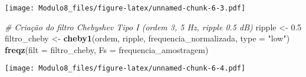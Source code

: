 \documentclass[
]{article}
\newenvironment{Shaded}{\begin{snugshade}}{\end{snugshade}}
\newcommand{\AttributeTok}[1]{\textcolor[rgb]{0.13,0.29,0.53}{#1}}
\newcommand{\CommentTok}[1]{\textcolor[rgb]{0.56,0.35,0.01}{\textit{#1}}}
\newcommand{\FloatTok}[1]{\textcolor[rgb]{0.00,0.00,0.81}{#1}}
\newcommand{\FunctionTok}[1]{\textcolor[rgb]{0.13,0.29,0.53}{\textbf{#1}}}
\newcommand{\NormalTok}[1]{#1}
\newcommand{\OtherTok}[1]{\textcolor[rgb]{0.56,0.35,0.01}{#1}}
\newcommand{\StringTok}[1]{\textcolor[rgb]{0.31,0.60,0.02}{#1}}
\begin{document}
\texttt{[image: Modulo8\_files/figure-latex/unnamed-chunk-6-3.pdf]}

\begin{Shaded}
\begin{Highlighting}[]
\CommentTok{\# Criação do filtro Chebyshev Tipo I (ordem 3, 5 Hz, ripple 0.5 dB)}
\NormalTok{ripple }\OtherTok{\textless{}{-}} \FloatTok{0.5}
\NormalTok{filtro\_cheby }\OtherTok{\textless{}{-}} \FunctionTok{cheby1}\NormalTok{(ordem, ripple, frequencia\_normalizada, }\AttributeTok{type =} \StringTok{"low"}\NormalTok{)}
\FunctionTok{freqz}\NormalTok{(}\AttributeTok{filt =}\NormalTok{ filtro\_cheby, }\AttributeTok{Fs =}\NormalTok{ frequencia\_amostragem)}
\end{Highlighting}
\end{Shaded}

\texttt{[image: Modulo8\_files/figure-latex/unnamed-chunk-6-4.pdf]}
\end{document}
